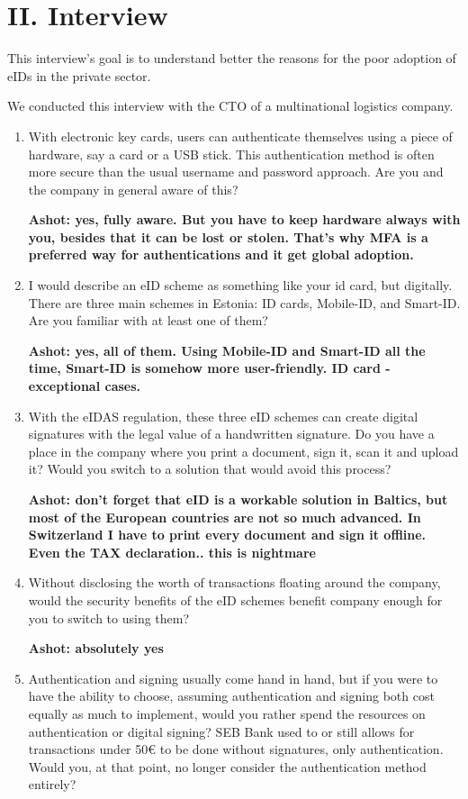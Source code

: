 \section*{II. Interview}
\label{appendix:interview}

This interview's goal is to understand better the reasons for the poor adoption of eIDs in the private sector.

We conducted this interview with the CTO of a multinational logistics company.

\begin{enumerate}
    \item With electronic key cards, users can authenticate themselves using a piece of hardware, say a card or a USB stick. This authentication method is often more secure than the usual username and password approach. Are you and the company in general aware of this?
    
    \textbf{Ashot: yes, fully aware. But you have to keep hardware always with you, besides that it can be lost or stolen. That's why MFA is a preferred way for authentications and it get global adoption.}
    \item I would describe an eID scheme as something like your id card, but digitally. There are three main schemes in Estonia: ID cards, Mobile-ID, and Smart-ID. Are you familiar with at least one of them?
    
    \textbf{Ashot: yes, all of them. Using Mobile-ID and Smart-ID all the time, Smart-ID is somehow more user-friendly. ID card - exceptional cases.}
    \item With the eIDAS regulation, these three eID schemes can create digital signatures with the legal value of a handwritten signature. Do you have a place in the company where you print a document, sign it, scan it and upload it? Would you switch to a solution that would avoid this process?
    
    \textbf{Ashot: don't forget that eID is a workable solution in Baltics, but most of the European countries are not so much advanced. In Switzerland I have to print every document and sign it offline. Even the TAX declaration.. this is nightmare}
    \item Without disclosing the worth of transactions floating around the company, would the security benefits of the eID schemes benefit company enough for you to switch to using them?
    
    \textbf{Ashot: absolutely yes}
    \item Authentication and signing usually come hand in hand, but if you were to have the ability to choose, assuming authentication and signing both cost equally as much to implement, would you rather spend the resources on authentication or digital signing? SEB Bank used to or still allows for transactions under 50€ to be done without signatures, only authentication. Would you, at that point, no longer consider the authentication method entirely?
    

\end{enumerate}
